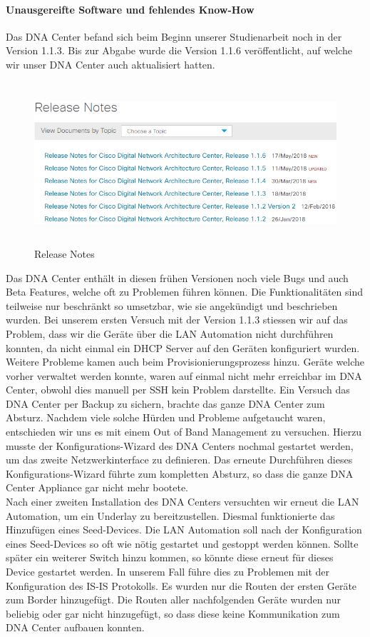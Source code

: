 \paragraph{Unausgereifte Software und fehlendes Know-How}
Das DNA Center befand sich beim Beginn unserer Studienarbeit noch in der Version 1.1.3. Bis zur Abgabe wurde die Version 1.1.6 veröffentlicht, auf welche wir unser DNA Center auch aktualisiert hatten. 
\begin{figure}[H]
	\centering
	\includegraphics[height=6cm]{img/ReleaseNotes.png}
	\caption{Release Notes}
	\label{fig:Release Notes}
\end{figure}
Das DNA Center enthält in diesen frühen Versionen noch viele Bugs und auch Beta Features, welche oft zu Problemen führen können. Die Funktionalitäten sind teilweise nur beschränkt so umsetzbar, wie sie angekündigt und beschrieben wurden. 
Bei unserem ersten Versuch mit der Version 1.1.3 stiessen wir auf das Problem, dass wir die Geräte über die LAN Automation nicht durchführen konnten, da nicht einmal ein DHCP Server auf den Geräten konfiguriert wurden. Weitere Probleme kamen auch beim Provisionierungsprozess hinzu. Geräte welche vorher verwaltet werden konnte, waren auf einmal nicht mehr erreichbar im DNA Center, obwohl dies manuell per SSH kein Problem darstellte. Ein Versuch das DNA Center per Backup zu sichern, brachte das ganze DNA Center zum Absturz. Nachdem viele solche Hürden und Probleme aufgetaucht waren, entschieden wir uns es mit einem Out of Band Management zu versuchen. Hierzu musste der Konfigurations-Wizard des DNA Centers nochmal gestartet werden, um das zweite Netzwerkinterface zu definieren. Das erneute Durchführen dieses Konfigurations-Wizard führte zum kompletten Absturz, so dass die ganze DNA Center Appliance gar nicht mehr bootete. \\
Nach einer zweiten Installation des DNA Centers versuchten wir erneut die LAN Automation, um ein Underlay zu bereitzustellen. Diesmal funktionierte das Hinzufügen eines Seed-Devices. Die LAN Automation soll nach der Konfiguration eines Seed-Devices so oft wie nötig gestartet und gestoppt werden können. Sollte später ein weiterer Switch hinzu kommen, so könnte diese erneut für dieses Device gestartet werden. In unserem Fall führe dies zu Problemen mit der Konfiguration des IS-IS Protokolls. Es wurden nur die Routen der ersten Geräte zum Border hinzugefügt. Die Routen aller nachfolgenden Geräte wurden nur beliebig oder gar nicht hinzugefügt, so dass diese keine Kommunikation zum DNA Center aufbauen konnten. 
